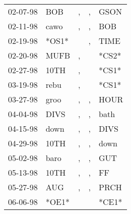 \begin{supertabular}{lllll}
 02-07-98 &    BOB &  , &  , &   GSON \\
 02-11-98 &   cawo &  , &  , &    BOB \\
 02-19-98 &  *OS1* &    &  , &   TIME \\
 02-20-98 &   MUFB &  , &    &  *CS2* \\
 02-27-98 &   10TH &  , &    &  *CS1* \\
 03-19-98 &   rebu &  , &    &  *CS1* \\
 03-27-98 &   groo &  , &  , &   HOUR \\
 04-04-98 &   DIVS &  , &  , &   bath \\
 04-15-98 &   down &  , &  , &   DIVS \\
 04-29-98 &   10TH &  , &  , &   down \\
 05-02-98 &   baro &  , &  , &    GUT \\
 05-13-98 &   10TH &  , &  , &     FF \\
 05-27-98 &    AUG &  , &  , &   PRCH \\
 06-06-98 &  *OE1* &    &    &  *CE1* \\
\end{supertabular}
